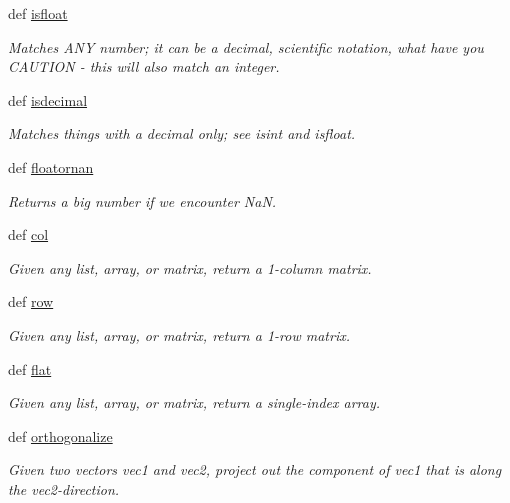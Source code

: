 \begin{DoxyCompactItemize}
def \hyperlink{namespaceforcebalance_1_1nifty_a8e3ef0108b9d37b82ba0dced7c6037ae}{isfloat}
\begin{DoxyCompactList}\small\item\em \-Matches \-A\-N\-Y number; it can be a decimal, scientific notation, what have you \-C\-A\-U\-T\-I\-O\-N -\/ this will also match an integer. \end{DoxyCompactList}\item 
def \hyperlink{namespaceforcebalance_1_1nifty_a09263927eaec9deff283fbf1a820242f}{isdecimal}
\begin{DoxyCompactList}\small\item\em \-Matches things with a decimal only; see isint and isfloat. \end{DoxyCompactList}\item 
def \hyperlink{namespaceforcebalance_1_1nifty_a8d63c8ae9a67c66673a6cf81357f827d}{floatornan}
\begin{DoxyCompactList}\small\item\em \-Returns a big number if we encounter \-Na\-N. \end{DoxyCompactList}\item 
def \hyperlink{namespaceforcebalance_1_1nifty_afb3f205bce4984856e766af7e9fdaca8}{col}
\begin{DoxyCompactList}\small\item\em \-Given any list, array, or matrix, return a 1-\/column matrix. \end{DoxyCompactList}\item 
def \hyperlink{namespaceforcebalance_1_1nifty_a6c9727360cdff8f3011a12cc54d0e86e}{row}
\begin{DoxyCompactList}\small\item\em \-Given any list, array, or matrix, return a 1-\/row matrix. \end{DoxyCompactList}\item 
def \hyperlink{namespaceforcebalance_1_1nifty_a52114ceee9d55f94d9aecb3e176de294}{flat}
\begin{DoxyCompactList}\small\item\em \-Given any list, array, or matrix, return a single-\/index array. \end{DoxyCompactList}\item 
def \hyperlink{namespaceforcebalance_1_1nifty_a7676236002c6a65ea7d2e69a09923889}{orthogonalize}
\begin{DoxyCompactList}\small\item\em \-Given two vectors vec1 and vec2, project out the component of vec1 that is along the vec2-\/direction. \end{DoxyCompactList}\item 

\end{DoxyCompactItemize}
